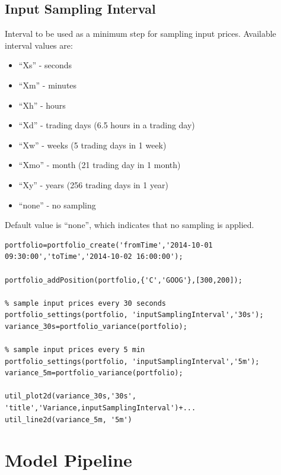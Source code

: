 \documentclass[letterpaper]{report}
\begin{document}
\subsection{Input Sampling Interval}
Interval to be used as a minimum step for sampling input prices. Available interval values are: 
\begin{itemize} 
  \item ``Xs'' - seconds
  \item ``Xm'' - minutes
  \item ``Xh'' - hours
  \item ``Xd'' - trading days (6.5 hours in a trading day)
  \item ``Xw'' - weeks (5 trading days in 1 week)
  \item ``Xmo'' - month (21 trading day in 1 month)
  \item ``Xy'' - years (256 trading days in 1 year)
  \item ``none'' - no sampling
\end{itemize}
Default value is ``none'', which indicates that no sampling is applied.
\begin{lstlisting}
portfolio=portfolio_create('fromTime','2014-10-01 09:30:00','toTime','2014-10-02 16:00:00');

portfolio_addPosition(portfolio,{'C','GOOG'},[300,200]);

% sample input prices every 30 seconds
portfolio_settings(portfolio, 'inputSamplingInterval','30s');
variance_30s=portfolio_variance(portfolio);

% sample input prices every 5 min
portfolio_settings(portfolio, 'inputSamplingInterval','5m');
variance_5m=portfolio_variance(portfolio);

util_plot2d(variance_30s,'30s', 'title','Variance,inputSamplingInterval')+...
util_line2d(variance_5m, '5m')
\end{lstlisting}


\section{Model Pipeline}
\end{document}
